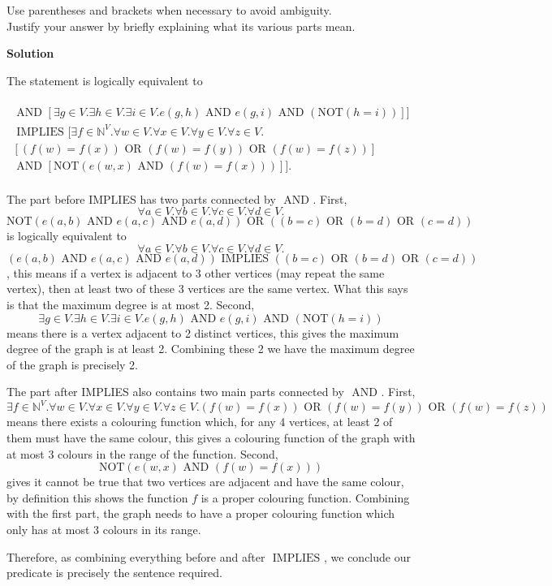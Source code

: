 \documentclass[12pt]{article}
\newcommand{\nnot}{\mathrm{NOT}}
\newcommand{\aand}{\,\,\mathrm{AND}\,\,}
\newcommand{\oor}{\,\,\mathrm{OR}\,\,}
\newcommand{\iimplies}{\,\,\mathrm{IMPLIES}\,\,}
\newcommand{\nats}{\mathbb{N}}
\begin{document}
\begin{enumerate}
Use parentheses and brackets when necessary to avoid ambiguity.\\
Justify your answer  by briefly explaining what its various parts mean.

\vspace{.25in}\textbf{Solution}\vspace{.10in}

The statement is logically equivalent to 

\begin{multline*}
    [[\forall a\in V.\forall b\in V.\forall c\in V.\forall d\in V.\\
    \nnot(e(a,b)\aand e(a,c)\aand e(a,d))\oor((b=c)\oor(b=d)\oor(c=d))]\\
    \aand[\exists g\in V.\exists h\in V. \exists i\in V. e(g,h)\aand e(g,i)\aand (\nnot(h=i))]]\\
    \iimplies[\exists f\in\nats^V.\forall w\in V.\forall x\in V.\forall y\in V.\forall z\in V.\\
    [(f(w)=f(x))\oor(f(w)=f(y))\oor(f(w)=f(z))] \\
    \aand [\nnot(e(w,x)\aand(f(w)=f(x)))]].
\end{multline*} 
\\
The part before IMPLIES has two parts connected by $\aand$. First, $$\forall a\in V.\forall b\in V.\forall c\in V.\forall d\in V.$$$$\nnot(e(a,b)\aand e(a,c)\aand e(a,d))\oor((b=c)\oor(b=d)\oor(c=d))$$ is logically equivalent to $$\forall a\in V.\forall b\in V.\forall c\in V.\forall d\in V.$$$$(e(a,b)\aand e(a,c)\aand e(a,d))\iimplies((b=c)\oor(b=d)\oor(c=d))$$, this means if a vertex is adjacent to 3 other vertices (may repeat the same vertex), then at least two of these 3 vertices are the same vertex. What this says is that the maximum degree is at most 2. Second, $$\exists g\in V.\exists h\in V. \exists i\in V. e(g,h)\aand e(g,i)\aand (\nnot(h=i))$$ means there is a vertex adjacent to 2 distinct vertices, this gives the maximum degree of the graph is at least 2. Combining these 2 we have the maximum degree of the graph is precisely 2.

The part after IMPLIES also contains two main parts connected by $\aand$. First, $$\exists f\in\nats^V.\forall w\in V.\forall x\in V.\forall y\in V.\forall z\in V.(f(w)=f(x))\oor(f(w)=f(y))\oor(f(w)=f(z))$$ means there exists a colouring function which, for any 4 vertices, at least 2 of them must have the same colour, this gives a colouring function of the graph with at most 3 colours in the range of the function. Second,  $$\nnot(e(w,x)\aand(f(w)=f(x)))$$ gives it cannot be true that two vertices are adjacent and have the same colour, by definition this shows the function $f$ is a proper colouring function. Combining with the first part, the graph needs to have a proper colouring function which only has at most 3 colours in its range.

Therefore, as combining everything before and after $\iimplies$, we conclude our predicate is precisely the sentence required.

\end{enumerate}
\end{document}
